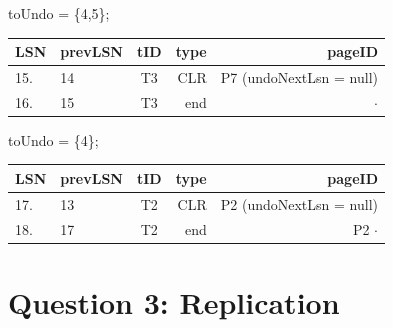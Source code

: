 \documentclass[paper=a4, fontsize=11pt]{scrartcl} %
\numberwithin{equation}{section} %
\numberwithin{figure}{section} %
\numberwithin{table}{section} %
\begin{document}
toUndo = \{4,5\};
\begin{center}
  \begin{tabular}{| l | l | c | r | r |}
    \hline
    \textbf{LSN} & \textbf{prevLSN} & \textbf{tID} & \textbf{type} & \textbf{pageID} \\ \hline
   15. & 14 & T3 & CLR & P7 (undoNextLsn = null) \\ \hline
   16. & 15 & T3 & end & $\cdot$ \\ \hline
  \end{tabular}
\end{center}

toUndo = \{4\};
\begin{center}
  \begin{tabular}{| l | l | c | r | r |}
    \hline
    \textbf{LSN} & \textbf{prevLSN} & \textbf{tID} & \textbf{type} & \textbf{pageID} \\ \hline
    17. & 13 & T2 & CLR & P2 (undoNextLsn = null)\\ \hline
    18. & 17 & T2 & end & P2 $\cdot$\\ \hline
  \end{tabular}
\end{center}


\section{Question 3: Replication}
\end{document}
